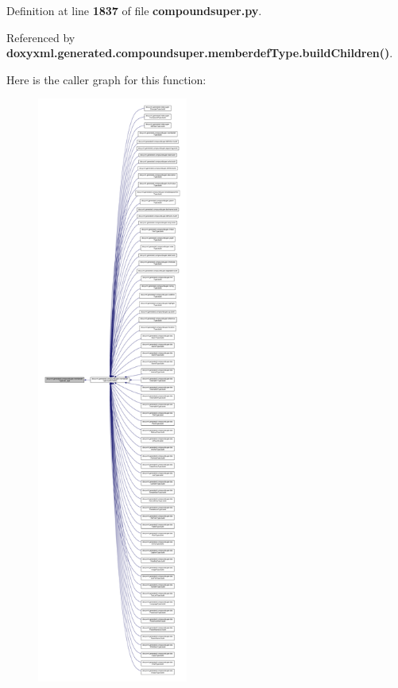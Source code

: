 Definition at line {\bf 1837} of file {\bf compoundsuper.\+py}.



Referenced by {\bf doxyxml.\+generated.\+compoundsuper.\+memberdef\+Type.\+build\+Children()}.



Here is the caller graph for this function\+:
\nopagebreak
\begin{figure}[H]
\begin{center}
\leavevmode
\includegraphics[height=550pt]{de/d3a/classdoxyxml_1_1generated_1_1compoundsuper_1_1memberdefType_a35bf5ec13ecd08005e6f537a78a8c390_icgraph}
\end{center}
\end{figure}


